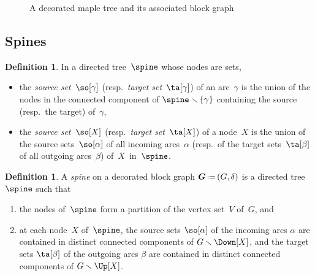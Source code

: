 \documentclass{amsart}
\theoremstyle{definition}
\newtheorem{definition}[theorem]{Definition}
\renewcommand{\b}[1]{{\boldsymbol{#1}}} %
\newcommand{\ssm}{\smallsetminus} %
\newcommand{\eqdef}{\mbox{\,\raisebox{0.2ex}{\scriptsize\ensuremath{\mathrm:}}\ensuremath{=}\,}} %
\newcommand{\darkblue}{\color{darkblue}} %
\newcommand{\defn}[1]{\textsl{\darkblue #1}} %
\newcommand{\vincent}[1]{\todo[color=blue!30]{#1 \\ \hfill --- V.}}
\newcommand{\vertexSet}{V}
\newcommand{\decoration}{\delta}
\begin{document}
\begin{figure}
{}
\caption{A decorated maple tree and its associated block graph}
\label{fig:mapleBlock}
\end{figure} 


\subsection{Spines}
\label{subsec:spines}

\begin{definition}
  \label{def:sourceTargetSets}
  In a directed tree~$\spine$ whose nodes are sets,
  \begin{itemize}
    \item the \defn{source set}~$\so[\gamma]$ (resp.~\defn{target set}~$\ta[\gamma]$) of an arc~$\gamma$ is the union of the nodes in the connected component of $\spine \ssm \{\gamma\}$ containing the source (resp.~the target) of~$\gamma$,
    \item the \defn{source set}~$\so[X]$ (resp.~\defn{target set}~$\ta[X]$) of a node~$X$ is the union of the source sets~$\so[\alpha]$ of all incoming arcs~$\alpha$ (resp.~of the target sets~$\ta[\beta]$ of all outgoing arcs~$\beta$) of~$X$~in~$\spine$.
  \end{itemize}
\end{definition}


\begin{definition}
  \label{def:spine}
  A \defn{spine} on a decorated block graph $\b{G} \eqdef (G,\decoration)$ is a directed tree $\spine$ such that
  \begin{enumerate}
    \item the nodes of~$\spine$ form a partition of the vertex set~$\vertexSet$ of~$G$, and 
    \item at each node~$X$ of~$\spine$, the source sets $\so[\alpha]$ of the incoming arcs $\alpha$ are contained in distinct connected components of $G \ssm \Down[X]$, and the target sets $\ta[\beta]$ of the outgoing arcs $\beta$ are contained in distinct connected components of $G \ssm \Up[X]$.
  \end{enumerate}
\end{definition}
\end{document}

